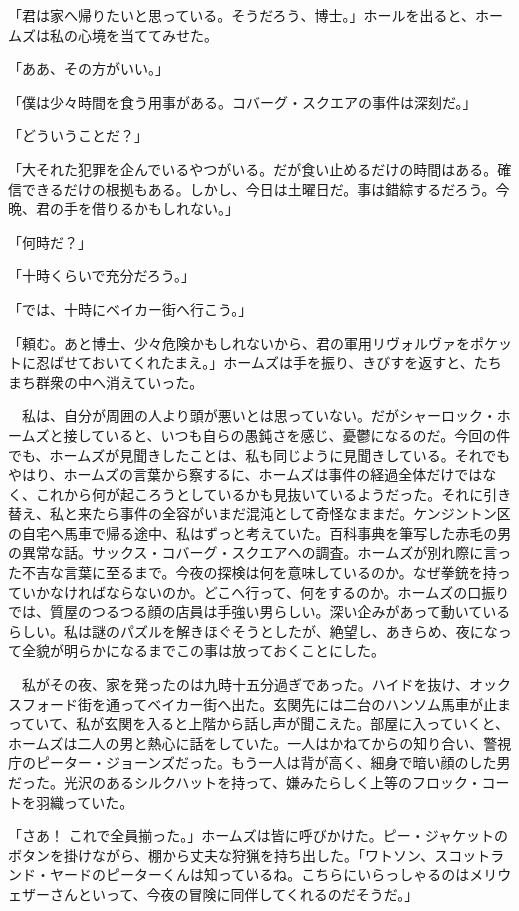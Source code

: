 \documentclass[tate,paper=b6j,jafontsize=9pt]{jlreq}
\begin{document}
「君は家へ帰りたいと思っている。そうだろう、博士。」ホールを出ると、ホームズは私の心境を当ててみせた。

「ああ、その方がいい。」

「僕は少々時間を食う用事がある。コバーグ・スクエアの事件は深刻だ。」

「どういうことだ？」

「大それた犯罪を企んでいるやつがいる。だが食い止めるだけの時間はある。確信できるだけの根拠もある。しかし、今日は土曜日だ。事は錯綜するだろう。今晩、君の手を借りるかもしれない。」

「何時だ？」

「十時くらいで充分だろう。」

「では、十時にベイカー街へ行こう。」

「頼む。あと博士、少々危険かもしれないから、君の軍用リヴォルヴァをポケットに忍ばせておいてくれたまえ。」ホームズは手を振り、きびすを返すと、たちまち群衆の中へ消えていった。

　私は、自分が周囲の人より頭が悪いとは思っていない。だがシャーロック・ホームズと接していると、いつも自らの愚鈍さを感じ、憂鬱になるのだ。今回の件でも、ホームズが見聞きしたことは、私も同じように見聞きしている。それでもやはり、ホームズの言葉から察するに、ホームズは事件の経過全体だけではなく、これから何が起ころうとしているかも見抜いているようだった。それに引き替え、私と来たら事件の全容がいまだ混沌として奇怪なままだ。ケンジントン区の自宅へ馬車で帰る途中、私はずっと考えていた。百科事典を筆写した赤毛の男の異常な話。サックス・コバーグ・スクエアへの調査。ホームズが別れ際に言った不吉な言葉に至るまで。今夜の探検は何を意味しているのか。なぜ拳銃を持っていかなければならないのか。どこへ行って、何をするのか。ホームズの口振りでは、質屋のつるつる顔の店員は手強い男らしい。深い企みがあって動いているらしい。私は謎のパズルを解きほぐそうとしたが、絶望し、あきらめ、夜になって全貌が明らかになるまでこの事は放っておくことにした。

　私がその夜、家を発ったのは九時十五分過ぎであった。ハイドを抜け、オックスフォード街を通ってベイカー街へ出た。玄関先には二台のハンソム馬車が止まっていて、私が玄関を入ると上階から話し声が聞こえた。部屋に入っていくと、ホームズは二人の男と熱心に話をしていた。一人はかねてからの知り合い、警視庁のピーター・ジョーンズだった。もう一人は背が高く、細身で暗い顔のした男だった。光沢のあるシルクハットを持って、嫌みたらしく上等のフロック・コートを羽織っていた。

「さあ！ これで全員揃った。」ホームズは皆に呼びかけた。ピー・ジャケットのボタンを掛けながら、棚から丈夫な狩猟を持ち出した。「ワトソン、スコットランド・ヤードのピーターくんは知っているね。こちらにいらっしゃるのはメリウェザーさんといって、今夜の冒険に同伴してくれるのだそうだ。」
\end{document}
